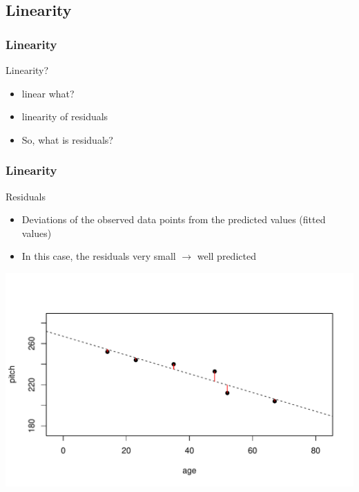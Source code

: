 \documentclass[10p]{beamer}\usepackage[]{graphicx}\usepackage[]{color}
\makeatletter
\def\maxwidth{ %
  \ifdim\Gin@nat@width>\linewidth
    \linewidth
  \else
    \Gin@nat@width
  \fi
}
\newenvironment{knitrout}{}{} %
\makeatother
\begin{document}
\subsection{Linearity}
\begin{frame}
\frametitle{Linearity}
Linearity?
\begin{itemize}
\item linear what?
\pause
\item linearity of residuals
\pause
\item So, what is residuals?
\end{itemize}
\end{frame}

\begin{frame}[fragile]
\frametitle{Linearity}
Residuals
\begin{itemize}
\item Deviations of the observed data points from the predicted values (fitted values)
\item In this case, the residuals very small $\rightarrow$ well predicted
\end{itemize}

\begin{knitrout}
\color{fgcolor}
\includegraphics[width=\maxwidth]{figure/unnamed-chunk-15-1} 

\end{knitrout}
\end{frame}
\end{document}
